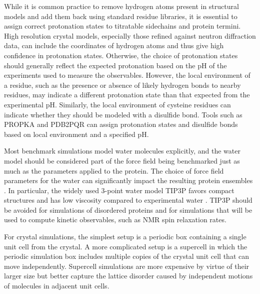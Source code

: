 \documentclass[9pt,review]{livecoms}
\begin{document}
While it is common practice to remove hydrogen atoms present in structural models and add them back using standard residue libraries, it is essential to assign correct protonation states to titratable sidechains and protein termini.
High resolution crystal models, especially those refined against neutron diffraction data, can include the coordinates of hydrogen atoms and thus give high confidence in protonation states.
Otherwise, the choice of protonation states should generally reflect the expected protonation based on the pH of the experiments used to measure the observables.
However, the local environment of a residue, such as the presence or absence of likely hydrogen bonds to nearby residues, may indicate a different protonation state than that expected from the experimental pH.
Similarly, the local environment of cysteine residues can indicate whether they should be modeled with a disulfide bond.
Tools such as PROPKA \cite{olsson_propka3_2011} and PDB2PQR \cite{jurrus_improvements_2018} can assign protonation states and disulfide bonds based on local environment and a specified pH.

Most benchmark simulations model water molecules explicitly, and the water model should be considered part of the force field being benchmarked just as much as the parameters applied to the protein.
The choice of force field parameters for the water can significantly impact the resulting protein ensembles \cite{piana_water_2015,tian_ff19sb_2020,coppa_accelerated_2023}.
In particular, the widely used 3-point water model TIP3P \cite{jorgensen_comparison_1983} favors compact structures \cite{tian_ff19sb_2020,coppa_accelerated_2023} and has low viscosity compared to experimental water \cite{kadaoluwa_pathirannahalage_systematic_2021}.
TIP3P should be avoided for simulations of disordered proteins and for simulations that will be used to compute kinetic observables, such as NMR spin relaxation rates.

For crystal simulations, the simplest setup is a periodic box containing a single unit cell from the crystal.
A more complicated setup is a supercell in which the periodic simulation box includes multiple copies of the crystal unit cell that can move independently.
Supercell simulations are more expensive by virtue of their larger size but better capture the lattice disorder caused by independent motions of molecules in adjacent unit cells.
\end{document}
